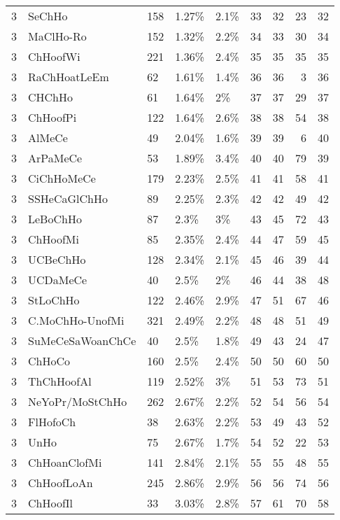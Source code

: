 \begin{longtable}{lllllrrrr}
  3 & SeChHo & 158 & 1.27\% & 2.1\% &  33 &  32 &  23 &  32 \\ 
  3 & MaClHo-Ro & 152 & 1.32\% & 2.2\% &  34 &  33 &  30 &  34 \\ 
  3 & ChHoofWi & 221 & 1.36\% & 2.4\% &  35 &  35 &  35 &  35 \\ 
  3 & RaChHoatLeEm & 62 & 1.61\% & 1.4\% &  36 &  36 &   3 &  36 \\ 
  3 & CHChHo & 61 & 1.64\% & 2\% &  37 &  37 &  29 &  37 \\ 
  3 & ChHoofPi & 122 & 1.64\% & 2.6\% &  38 &  38 &  54 &  38 \\ 
  3 & AlMeCe & 49 & 2.04\% & 1.6\% &  39 &  39 &   6 &  40 \\ 
  3 & ArPaMeCe & 53 & 1.89\% & 3.4\% &  40 &  40 &  79 &  39 \\ 
  3 & CiChHoMeCe & 179 & 2.23\% & 2.5\% &  41 &  41 &  58 &  41 \\ 
  3 & SSHeCaGlChHo & 89 & 2.25\% & 2.3\% &  42 &  42 &  49 &  42 \\ 
  3 & LeBoChHo & 87 & 2.3\% & 3\% &  43 &  45 &  72 &  43 \\ 
  3 & ChHoofMi & 85 & 2.35\% & 2.4\% &  44 &  47 &  59 &  45 \\ 
  3 & UCBeChHo & 128 & 2.34\% & 2.1\% &  45 &  46 &  39 &  44 \\ 
  3 & UCDaMeCe & 40 & 2.5\% & 2\% &  46 &  44 &  38 &  48 \\ 
  3 & StLoChHo & 122 & 2.46\% & 2.9\% &  47 &  51 &  67 &  46 \\ 
  3 & C.MoChHo-UnofMi & 321 & 2.49\% & 2.2\% &  48 &  48 &  51 &  49 \\ 
  3 & SuMeCeSaWoanChCe & 40 & 2.5\% & 1.8\% &  49 &  43 &  24 &  47 \\ 
  3 & ChHoCo & 160 & 2.5\% & 2.4\% &  50 &  50 &  60 &  50 \\ 
  3 & ThChHoofAl & 119 & 2.52\% & 3\% &  51 &  53 &  73 &  51 \\ 
  3 & NeYoPr/MoStChHo & 262 & 2.67\% & 2.2\% &  52 &  54 &  56 &  54 \\ 
  3 & FlHofoCh & 38 & 2.63\% & 2.2\% &  53 &  49 &  43 &  52 \\ 
  3 & UnHo & 75 & 2.67\% & 1.7\% &  54 &  52 &  22 &  53 \\ 
  3 & ChHoanClofMi & 141 & 2.84\% & 2.1\% &  55 &  55 &  48 &  55 \\ 
  3 & ChHoofLoAn & 245 & 2.86\% & 2.9\% &  56 &  56 &  74 &  56 \\ 
  3 & ChHoofIl & 33 & 3.03\% & 2.8\% &  57 &  61 &  70 &  58 \\ 

\end{longtable}
